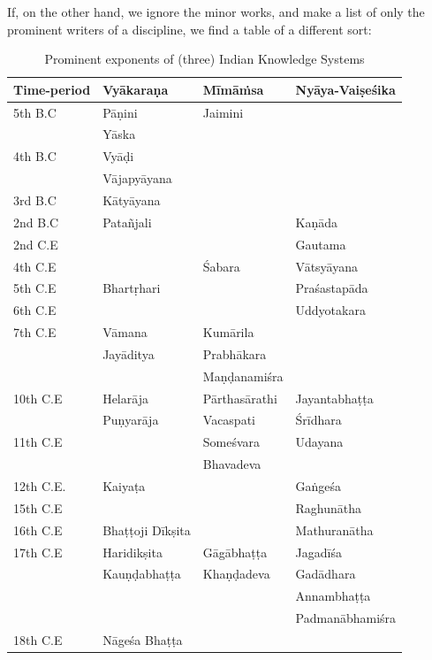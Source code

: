 If, on the other hand, we ignore the minor works, and make a list of only the prominent writers of a discipline, we find a table of a different sort: 
\begin{table}[H]
\centering
\tabcolsep=3pt
\renewcommand{\arraystretch}{1.2}
\begin{tabular}{|l|l|l|l|}
\hline
\textbf{Time-period} & \textbf{Vyākaraṇa}\index{Vyakarana@Vyākaraṇa} & \textbf{Mīmāṁsa} & \textbf{Nyāya-Vaiṣeśika}\index{Nyaya-Vaisesika@Nyāya-Vaiṣeśika}\\\hline
5th B.C & Pāṇini &  Jaimini  & \\\hline
& Yāska & & \\\hline
4th B.C & Vyāḍi & & \\\hline
& Vājapyāyana & & \\\hline
3rd B.C & Kātyāyana & & \\\hline
2nd B.C & Patañjali\index{Patanjali@Patañjali} & & Kaṇāda\\\hline
2nd C.E & & & Gautama\\\hline
4th C.E & & Śabara & Vātsyāyana\\\hline
5th C.E & Bhartṛhari & & Praśastapāda\\\hline
6th C.E& & & Uddyotakara\\\hline
7th C.E & Vāmana & Kumārila & \\\hline
& Jayāditya & Prabhākara & \\\hline
& & Maṇḍanamiśra & \\\hline
10th C.E & Helarāja & Pārthasārathi & Jayantabhaṭṭa\index{Jayantabhatta@Jayantabhaṭṭa}\\\hline
 & Puṇyarāja & Vacaspati & Śrīdhara\\\hline
11th C.E & & Someśvara & Udayana\\\hline
& & Bhavadeva & \\\hline
12th C.E. & Kaiyaṭa & & Gaṅgeśa\\\hline
15th C.E & & & Raghunātha\\\hline
16th C.E & Bhaṭṭoji Dīkṣita & & Mathuranātha\\\hline
17th C.E & Haridikṣita & Gāgābhaṭṭa & Jagadīśa\\\hline
& Kauṇḍabhaṭṭa & Khaṇḍadeva & Gadādhara\\\hline
& & & Annambhaṭṭa\\\hline
& & & Padmanābhamiśra\\\hline
18th C.E  & Nāgeśa Bhaṭṭa & & \\\hline
\end{tabular}
\caption{Prominent exponents of (three) Indian Knowledge Systems}\label{chap2-tab1}
\end{table}

